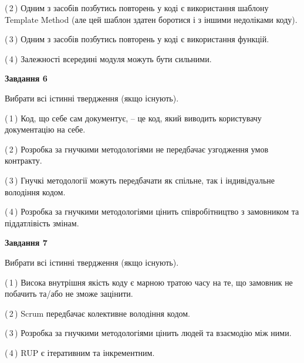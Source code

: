 \documentclass[10pt, ukrainian]{article}
\begin{document}
{\begin {large}
(\,2\,) Одним з засобів позбутись повторень у коді є використання шаблону Template Method (але цей шаблон здатен боротися і з іншими недоліками коду). %



(\,3\,) Одним з засобів позбутись повторень у коді є використання функцій. %



(\,4\,) Залежності всередині модуля можуть бути сильними. %

\newpage

{\begin {center}\textbf{Завдання 6}\end {center}}\par
Вибрати всі істинні твердження (якщо існують).\par
\vspace{2mm}



(\,1\,) Код, що себе сам документує, -- це код, який виводить користувачу документацію на себе. %



(\,2\,) Розробка за гнучкими методологіями не передбачає узгодження умов контракту. %



(\,3\,) Гнучкі методології можуть передбачати як спільне, так і індивідуальне володіння кодом. %



(\,4\,) Розробка за гнучкими методологіями цінить співробітництво з замовником та піддатлівість змінам. %


{\begin {center}\textbf{Завдання 7}\end {center}}\par
Вибрати всі істинні твердження (якщо існують).\par
\vspace{2mm}



(\,1\,) Висока внутрішня якість коду є марною тратою часу на те, що замовник не побачить та/або не зможе зацінити. %



(\,2\,) Scrum передбачає колективне володіння кодом. %



(\,3\,) Розробка за гнучкими методологіями цінить людей та взаємодію між ними. %



(\,4\,) RUP є ітеративним та інкрементним.%



\end{large}}
\end{document}
